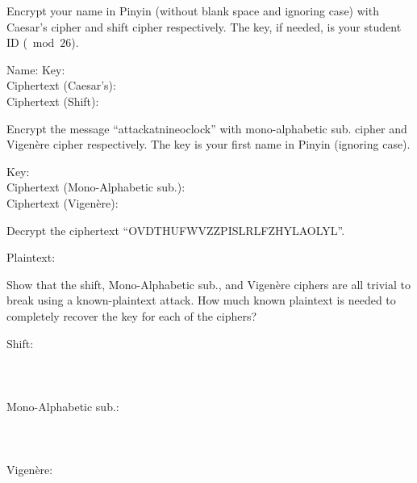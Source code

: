 \documentclass[12pt,letterpaper,boxed]{amspset}
\begin{document}

\begin{problem}[1.1]
Encrypt your name in Pinyin (without blank space and ignoring case) with Caesar's cipher and shift cipher respectively. The key, if needed, is your student ID ($\bmod 26$).  
\end{problem}

\begin{solution}
Name:\hspace{5cm} Key: \\
Ciphertext (Caesar's): \\
Ciphertext (Shift):
\end{solution}

\begin{problem}[1.2]
Encrypt the message ``attackatnineoclock'' with mono-alphabetic sub. cipher and Vigen\`{e}re cipher respectively. The key is your first name in Pinyin (ignoring case).  
\end{problem}

\begin{solution}
Key:\\
Ciphertext (Mono-Alphabetic sub.):\\
Ciphertext (Vigen\`{e}re):
\end{solution}

\begin{problem}[1.3]
Decrypt the ciphertext ``OVDTHUFWVZZPISLRLFZHYLAOLYL''.  
\end{problem}

\begin{solution}
Plaintext:
\end{solution}

\begin{problem}[1.4]
Show that the shift, Mono-Alphabetic sub., and Vigen\`{e}re ciphers are all trivial to break using a known-plaintext attack. How much known plaintext is needed to completely recover the key for each of the ciphers?  
\end{problem}

\begin{solution}
Shift:\\
\\
\\
\\
Mono-Alphabetic sub.:\\
\\
\\
\\
Vigen\`{e}re: \\
\\
\\
\end{solution}
\end{document}
